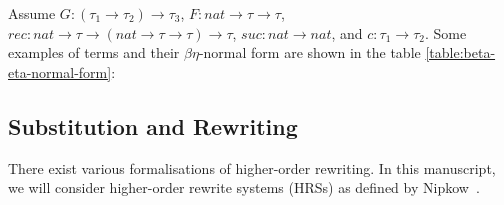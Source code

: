 \begin{example}
Assume $G : (\tau_1 \to \tau_2) \to \tau_3$, $F : nat \to \tau \to \tau$, $rec : nat \to \tau\to (nat \to \tau\to \tau) \to \tau$, $suc : nat \to nat$, and $c : \tau_1 \to \tau_2$. Some examples of terms and their $\beta\eta$-normal form are shown in the table \ref{table:beta-eta-normal-form}:

{}%


\end{example}

\subsection{Substitution and Rewriting}
\label{sec:substitution-rewriting}
There exist various formalisations of higher-order rewriting. In this manuscript, we will consider higher-order rewrite systems (HRSs) as defined by Nipkow~\cite{Mayr-Nipkow-TCS}. 

